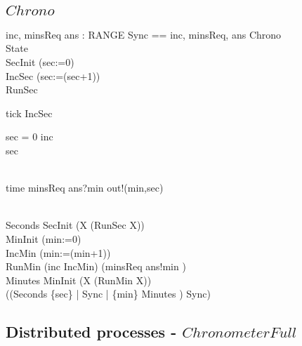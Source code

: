 \subsection{$Chrono$}
\begin{circus}
\circchannel inc, minsReq
\also \circchannel ans : RANGE
\also \circchannelset Sync == \lchanset inc, minsReq, ans \rchanset
\also \circprocess Chrono \circdef\ \circbegin\\
\circstate State \\
\qquad SecInit \circdef (sec:=0)\\
\qquad IncSec \circdef (sec:=(sec+1))\\
\qquad RunSec \circdef\\
\qquad\qquad\begin{block}\begin{block}tick \then IncSec \circseq\\
    \begin{block}\circif  sec = 0 \circthen inc \then \Skip\\
    \circelse sec  \circthen \Skip \circfi\end{block}\end{block}\\
  \extchoice time \then minsReq \then ans?min \then out!(min,sec)
      \then \Skip \end{block}  \\
\qquad Seconds \circdef SecInit \circseq (\circmu X \circspot (RunSec \circseq X))\\
\qquad MinInit \circdef (min:=0)\\
\qquad IncMin \circdef (min:=(min+1))\\
\qquad RunMin \circdef (inc \then IncMin) \extchoice (minsReq \then ans!min \then \Skip)\\
\qquad Minutes \circdef MinInit \circseq (\circmu X \circspot (RunMin \circseq X))\\
\circspot ((Seconds \lpar \{sec\} | Sync | \{min\} \rpar Minutes ) \circhide Sync)\\
\circend
\end{circus}
\subsection{Distributed processes - $ChronometerFull$}
